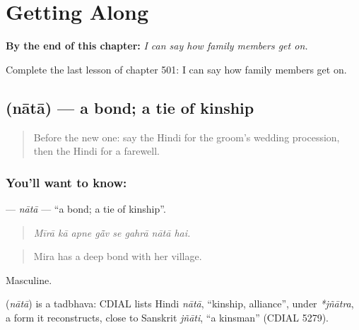
\chapter{Getting Along}
\label{ch:hi-getting-along}

\begin{chapteropening}
\textbf{By the end of this chapter:} \emph{I can say how family members get on.}

Complete the last lesson of chapter 501: I can say how family members get on.
\end{chapteropening}

\section[\texorpdfstring{\hi{नाता} (nātā)}{नाता (nātā)}]{ (nātā) — a bond; a tie of kinship}

\label{lesson:HI-C501-nata}



\begin{quote}
Before the new one: say the Hindi for the groom's wedding procession, then the Hindi for a farewell.
\end{quote}

\subsection*{You'll want to know: }
\textbf{} — \emph{nātā} — \textquotedblleft{}a bond; a tie of kinship\textquotedblright{}.

\begin{quote}
       
\end{quote}

\begin{quote}
\emph{Mīrā kā apne gā̃v se gahrā nātā hai.}
\end{quote}

\begin{quote}
Mira has a deep bond with her village.
\end{quote}

Masculine.

\begin{cousinweb}
\textbf{} (\emph{nātā}) is a tadbhava: CDIAL lists Hindi \emph{nātā}, \textquotedblleft{}kinship, alliance\textquotedblright{}, under \emph{*jñātra}, a form it reconstructs, close to Sanskrit \emph{jñāti}, \textquotedblleft{}a kinsman\textquotedblright{} (CDIAL 5279).
\end{cousinweb}

